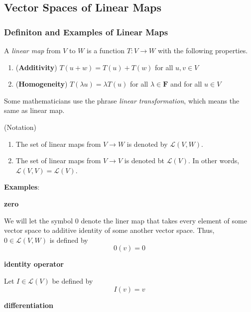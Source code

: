 \subsection{Vector Spaces of Linear Maps}

\subsubsection{Definiton and Examples of Linear Maps}
\begin{definition}
    A \textit{linear map} from $V$ to $W$ is a function $T: V \to W$ with the following properties.
    \begin{enumerate}
        \item (\textbf{Additivity}) $T(u+w)=T(u)+T(w)$ for all $u,v \in V$
        \item (\textbf{Homogeneity}) $T(\lambda u)=\lambda T(u)$ for all $\lambda \in \mathbf{F}$ and for all $u \in V$
    \end{enumerate}
\end{definition}

\begin{remark}
    Some mathematicians use the phrase \textit{linear transformation}, which means the same as linear map.
\end{remark}

\begin{definition}{(Notation)}
    \begin{enumerate}
        \item The set of linear maps from $V \to W$ is denoted by $\mathcal{L}(V,W)$.
        \item The set of linear maps from $V \to V$ is denoted bt $\mathcal{L}(V)$. In other words, $\mathcal{L}(V,V)=\mathcal{L}(V)$.
    \end{enumerate}
\end{definition}

\textbf{Examples}:

\vspace{4mm}
\textbf{zero}

We will let the symbol $0$ denote the liner map that takes every element of some vector space to additive identity of some another 
vector space. Thus, $0 \in \mathcal{L}(V,W)$ is defined by 
\[ 0(v)=0 \]

\textbf{identity operator}

Let $I \in \mathcal{L}(V)$ be defined by
\[ I(v)=v \]

\textbf{differentiation}

